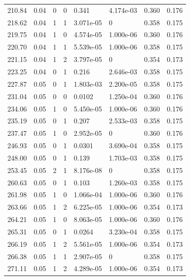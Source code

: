 \documentclass[preview]{standalone}
\begin{document}
{{{\begin{tabular}{L{1.2cm}C{1.2cm} C{0.3cm}C{0.5cm} C{1.4cm}C{1.4cm} C{1.4cm}C{1.4cm}}
  210.84  &  0.04  & 0     &  0 &  0.341  & 4.174e-03  & 0.360 &  0.176   \\ 
  218.62  &  0.04  & 1     &  1 &  3.071e-05  & 0  & 0.358 &  0.175   \\ 
  219.75  &  0.04  & 1     &  0 &  4.574e-05  & 1.000e-06  & 0.360 &  0.176   \\ 
  220.70  &  0.04  & 1     &  1 &  5.539e-05  & 1.000e-06  & 0.358 &  0.175   \\ 
  221.15  &  0.04  & 1     &  2 &  3.797e-05  & 0  & 0.354 &  0.173   \\ 
  223.25  &  0.04  & 0     &  1 &  0.216  & 2.646e-03  & 0.358 &  0.175   \\ 
  227.87  &  0.05  & 0     &  1 &  1.803e-03  & 2.200e-05  & 0.358 &  0.175   \\ 
  231.04  &  0.05  & 0     &  0 &  0.0102  & 1.250e-04  & 0.360 &  0.176   \\ 
  234.06  &  0.05  & 1     &  0 &  5.450e-05  & 1.000e-06  & 0.360 &  0.176   \\ 
  235.19  &  0.05  & 0     &  1 &  0.207  & 2.533e-03  & 0.358 &  0.175   \\ 
  237.47  &  0.05  & 1     &  0 &  2.952e-05  & 0  & 0.360 &  0.176   \\ 
  246.93  &  0.05  & 0     &  1 &  0.0301  & 3.690e-04  & 0.358 &  0.175   \\ 
  248.00  &  0.05  & 0     &  1 &  0.139  & 1.703e-03  & 0.358 &  0.175   \\ 
  253.45  &  0.05  & 2     &  1 &  8.176e-08  & 0  & 0.358 &  0.175   \\ 
  260.63  &  0.05  & 0     &  1 &  0.103  & 1.260e-03  & 0.358 &  0.175   \\ 
  261.98  &  0.05  & 1     &  0 &  1.066e-04  & 1.000e-06  & 0.360 &  0.176   \\ 
  263.66  &  0.05  & 1     &  2 &  6.225e-05  & 1.000e-06  & 0.354 &  0.173   \\ 
  264.21  &  0.05  & 1     &  0 &  8.063e-05  & 1.000e-06  & 0.360 &  0.176   \\ 
  265.31  &  0.05  & 0     &  1 &  0.0264  & 3.230e-04  & 0.358 &  0.175   \\ 
  266.19  &  0.05  & 1     &  2 &  5.561e-05  & 1.000e-06  & 0.354 &  0.173   \\ 
  266.38  &  0.05  & 1     &  1 &  2.907e-05  & 0  & 0.358 &  0.175   \\ 
  271.11  &  0.05  & 1     &  2 &  4.289e-05  & 1.000e-06  & 0.354 &  0.173   \\ 

\end{tabular}}}}
\end{document}
